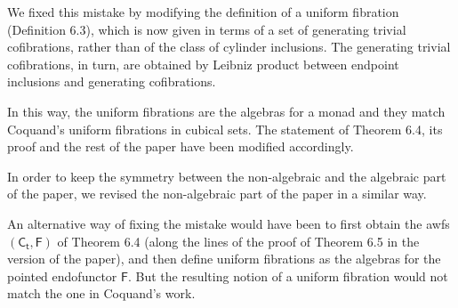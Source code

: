 \documentclass[reqno,10pt,a4paper,oneside,draft]{amsart}
\begin{document}
\begin{itemize}
We fixed this mistake by modifying the definition of a uniform fibration (Definition 6.3), which is now given in terms of a set of generating trivial cofibrations, rather than of
the class of cylinder inclusions. The generating trivial cofibrations, in turn, are obtained by Leibniz product between endpoint inclusions and generating cofibrations. 

In this way, the uniform fibrations are the algebras for a monad and they match Coquand's uniform fibrations in cubical sets. The statement
of Theorem 6.4, its proof and the rest of the paper have been modified accordingly. 

In order to keep the symmetry between the non-algebraic and the algebraic part of the paper,
we  revised  the non-algebraic part of the paper in a similar way. 

An alternative way of fixing the mistake would have been to first obtain the awfs $(\mathsf{C_t}, \mathsf{F})$ of Theorem 6.4 (along the lines of the proof of Theorem 6.5 in the version of the paper), and then define uniform fibrations as the algebras for the pointed endofunctor $\mathsf{F}$.
But the resulting notion of a uniform fibration would not match the one in Coquand's work.

\end{itemize}
\end{document}
